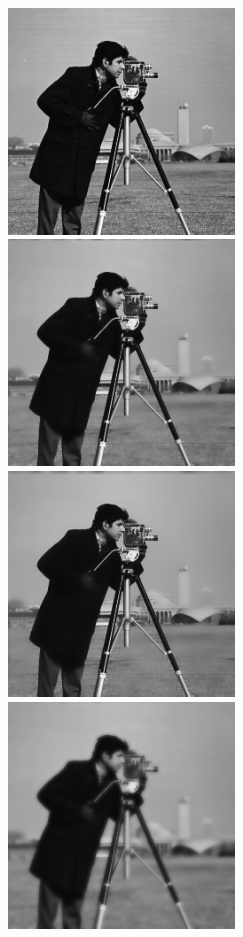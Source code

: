 \documentclass[a4paper,12pt,titlepage]{article}
\begin{document}
\begin{figure}[ht!]
\centering
\includegraphics[width=60mm]{img/img.png}
\includegraphics[width=60mm]{img/imgGF2_01.png}
\includegraphics[width=60mm]{img/imgGF4_01.png}
\includegraphics[width=60mm]{img/imgGF2_16.png}

\end{figure}
\end{document}
